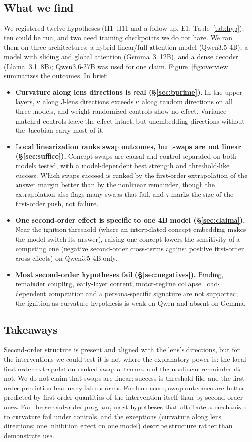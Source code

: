 \documentclass[10pt]{article}
\newcommand{\figref}[1]{Figure~\ref{#1}}
\newcommand{\secref}[1]{\S\ref{#1}}
\begin{document}
\subsection{What we find}
We registered twelve hypotheses (H1--H11 and a follow-up, E1; Table~\ref{tab:hyp}); ten could be run, and two need training checkpoints we do not have. We ran them on three architectures: a hybrid linear/full-attention model (Qwen3.5-4B), a model with sliding and global attention (Gemma~3~12B), and a dense decoder (Llama~3.1~8B); Qwen3.6-27B was used for one claim. \figref{fig:overview} summarizes the outcomes. In brief:
\begin{itemize}
\item \textbf{Curvature along lens directions is real (\secref{sec:bprime}).} In the upper layers, $\kappa$ along J-lens directions exceeds $\kappa$ along random directions on all three models, and weight-randomized controls show no effect. Variance-matched controls leave the effect intact, but unembedding directions without the Jacobian carry most of it.
\item \textbf{Local linearization ranks swap outcomes, but swaps are not linear (\secref{sec:suffice}).} Concept swaps are causal and control-separated on both models tested, with a model-dependent best strength and threshold-like success. Which swaps succeed is ranked by the first-order extrapolation of the answer margin better than by the nonlinear remainder, though the extrapolation also flags many swaps that fail, and $\tau$ marks the size of the first-order push, not failure.
\item \textbf{One second-order effect is specific to one 4B model (\secref{sec:claima}).} Near the ignition threshold (where an interpolated concept embedding makes the model switch its answer), raising one concept lowers the sensitivity of a competing one (negative second-order cross-terms against positive first-order cross-effects) on Qwen3.5-4B only.
\item \textbf{Most second-order hypotheses fail (\secref{sec:negatives}).} Binding, remainder coupling, early-layer content, motor-regime collapse, load-dependent competition and a persona-specific signature are not supported; the ignition-as-curvature hypothesis is weak on Qwen and absent on Gemma.
\end{itemize}

\subsection{Takeaways}
Second-order structure is present and aligned with the lens's directions, but for the interventions we could test it is not where the explanatory power is: the local first-order extrapolation ranked swap outcomes and the nonlinear remainder did not. We do not claim that swaps are linear; success is threshold-like and the first-order prediction has many false alarms. For lens users, swap outcomes are better predicted by first-order quantities of the intervention itself than by second-order ones. For the second-order program, most hypotheses that attribute a mechanism to curvature fail under controls, and the exceptions (curvature along lens directions; one inhibition effect on one model) describe structure rather than demonstrate use.
\end{document}
